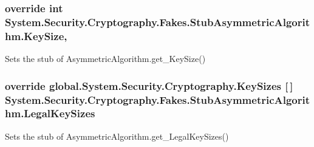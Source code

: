 \hypertarget{class_system_1_1_security_1_1_cryptography_1_1_fakes_1_1_stub_asymmetric_algorithm_a2a0f8487078ea7280b8284658e71d28b}{
\subsubsection[{Key\-Size}]{\setlength{\rightskip}{0pt plus 5cm}override int System.\-Security.\-Cryptography.\-Fakes.\-Stub\-Asymmetric\-Algorithm.\-Key\-Size\hspace{0.3cm}{\ttfamily [get]}, {\ttfamily [set]}}}\label{class_system_1_1_security_1_1_cryptography_1_1_fakes_1_1_stub_asymmetric_algorithm_a2a0f8487078ea7280b8284658e71d28b}


Sets the stub of Asymmetric\-Algorithm.\-get\-\_\-\-Key\-Size()

\hypertarget{class_system_1_1_security_1_1_cryptography_1_1_fakes_1_1_stub_asymmetric_algorithm_ac611f27f07f38f78a02eae0d06aabeb6}{
\subsubsection[{Legal\-Key\-Sizes}]{\setlength{\rightskip}{0pt plus 5cm}override global.\-System.\-Security.\-Cryptography.\-Key\-Sizes \mbox{[}$\,$\mbox{]} System.\-Security.\-Cryptography.\-Fakes.\-Stub\-Asymmetric\-Algorithm.\-Legal\-Key\-Sizes\hspace{0.3cm}{\ttfamily [get]}}}\label{class_system_1_1_security_1_1_cryptography_1_1_fakes_1_1_stub_asymmetric_algorithm_ac611f27f07f38f78a02eae0d06aabeb6}


Sets the stub of Asymmetric\-Algorithm.\-get\-\_\-\-Legal\-Key\-Sizes()

